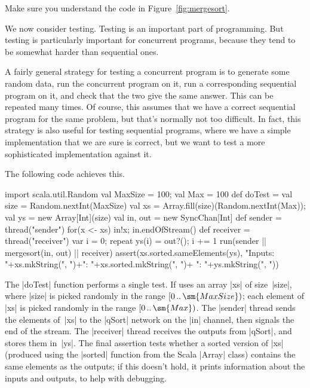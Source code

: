 \begin{instruction}
Make sure you understand the code in Figure~\ref{fig:mergesort}.
\end{instruction}


We now consider testing.  Testing is an important part of programming.  But
testing is particularly important for concurrent programs, because they tend
to be somewhat harder than sequential ones.

A fairly general strategy for testing a concurrent program is to generate some
random data, run the concurrent program on it, run a corresponding sequential
program on it, and check that the two give the same answer.  This can be
repeated many times.  Of course, this assumes that we have a correct
sequential program for the same problem, but that's normally not too
difficult.  In fact, this strategy is also useful for testing sequential
programs, where we have a simple implementation that we are sure is correct,
but we want to test a more sophisticated implementation against it.

The following code achieves this.
%
\begin{scala}
  import scala.util.Random
  val MaxSize = 100; val Max = 100
  def doTest = {
    val size = Random.nextInt(MaxSize)
    val xs = Array.fill(size)(Random.nextInt(Max)); val ys = new Array[Int](size)
    val in, out = new SyncChan[Int]
    def sender = thread("sender"){ for(x <- xs) in!x; in.endOfStream() }
    def receiver = thread("receiver"){ 
      var i = 0; repeat{ ys(i) = out?(); i += 1 } 
    }
    run(sender || mergesort(in, out) || receiver)
    assert(xs.sorted.sameElements(ys),
      "Inputs: "+xs.mkString(", ")+"\nExpected: "+xs.sorted.mkString(", ")+
      "\nReceived: "+ys.mkString(", "))
  }
\end{scala}
%
The |doTest| function performs a single test.  If uses an array |xs| of
size~|size|, where |size| is picked randomly in the range
$\interval{0}{\sm{MaxSize}}$; each element of |xs| is picked randomly in the
range $\interval{0}{\sm{Max}}$.  The |sender| thread sends the elements
of~|xs| to the |qSort| network on the |in| channel, then signals the end of
the stream.  The |receiver| thread receives the outputs from |qSort|, and
stores them in~|ys|.  The final assertion tests whether a sorted version of
|xs| (produced using the |sorted| function from the Scala |Array| class)
contains the same elements as the outputs; if this doesn't hold, it prints
information about the inputs and outputs, to help with debugging.

